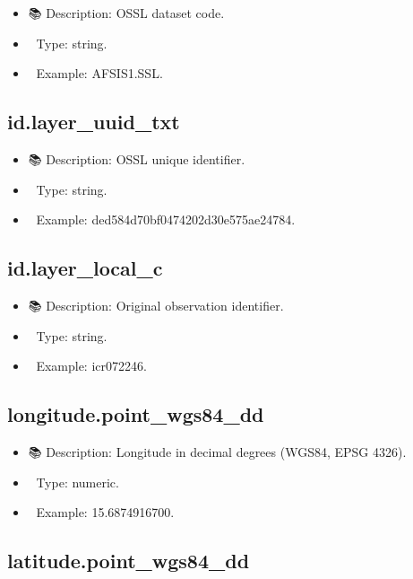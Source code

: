 \documentclass[
  letterpaper,
  DIV=11,
  numbers=noendperiod]{scrreprt}
\providecommand{\tightlist}{%
  \setlength{\itemsep}{0pt}\setlength{\parskip}{0pt}}\usepackage{longtable,booktabs,array}
\begin{document}
\begin{itemize}
\tightlist
\item
  📚 Description: OSSL dataset code.
\item
  🔢 Type: string.
\item
  📖 Example: AFSIS1.SSL.
\end{itemize}

\subsection{id.layer\_uuid\_txt}\label{id.layer_uuid_txt}

\begin{itemize}
\tightlist
\item
  📚 Description: OSSL unique identifier.
\item
  🔢 Type: string.
\item
  📖 Example: ded584d70bf0474202d30e575ae24784.
\end{itemize}

\subsection{id.layer\_local\_c}\label{id.layer_local_c}

\begin{itemize}
\tightlist
\item
  📚 Description: Original observation identifier.
\item
  🔢 Type: string.
\item
  📖 Example: icr072246.
\end{itemize}

\subsection{longitude.point\_wgs84\_dd}\label{longitude.point_wgs84_dd}

\begin{itemize}
\tightlist
\item
  📚 Description: Longitude in decimal degrees (WGS84, EPSG 4326).
\item
  🔢 Type: numeric.
\item
  📖 Example: 15.6874916700.
\end{itemize}

\subsection{latitude.point\_wgs84\_dd}\label{latitude.point_wgs84_dd}
\end{document}
